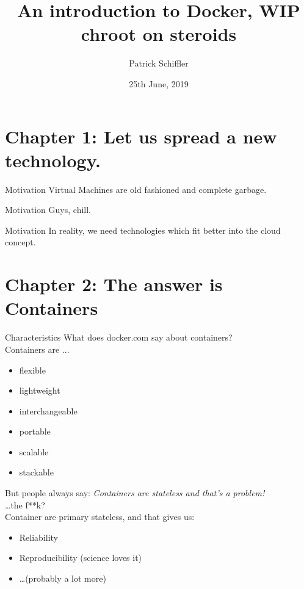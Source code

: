 \documentclass[aspectratio=169]{beamer}
\title{An introduction to Docker, WIP\\\small{chroot on steroids}}
\date{25th June, 2019}
\author{Patrick Schiffler}
\institute{}
\begin{document}
	\maketitle
	
	\section{Chapter 1: Let us spread a new technology.}
	
	\begin{frame}{Motivation}
		Virtual Machines are old fashioned and complete garbage. \Vomey[2]
	\end{frame}
	
	\begin{frame}{Motivation}
		Guys, chill. \Cooley[2]
	\end{frame}
	
	\begin{frame}{Motivation}
		In reality, we need technologies which fit better into the cloud concept.
	\end{frame}
	
	\section{Chapter 2: The answer is Containers}
	
	\begin{frame}[allowframebreaks]{Characteristics}
		What does docker.com say about containers?\\
		Containers are ...
		\begin{itemize}
			\item flexible
		  	\item lightweight
		  	\item interchangeable
		  	\item portable
		  	\item scalable
		  	\item stackable
	  	\end{itemize}
		\framebreak
		But people always say: \emph{Containers are stateless and that's a problem!}\\
		\vspace{5em}
		\dots the f**k?
		\framebreak
		\\Container are primary stateless, and that gives us:
		\begin{itemize}
			\item Reliability
			\item Reproducibility (science loves it)
			\item \dots (probably a lot more)
		\end{itemize}
  	\end{frame}
\end{document}
